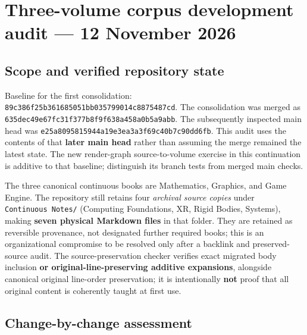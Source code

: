 \hypertarget{appendix-28e6f216fdc7}{}\label{referencestart:appendix-28e6f216fdc7}
\section{Three-volume corpus development audit --- 12 November 2026}\label{appendix-28e6f216fdc7-three-volume-corpus-development-audit-12-november-2026}

\subsection{Scope and verified repository state}\label{appendix-28e6f216fdc7-scope-and-verified-repository-state}

Baseline for the first consolidation: \texttt{89c386f25b361685051bb035799014c8875487cd}. The consolidation was merged as \texttt{635dec49e67fc31f377b8f9f638a458a0b5a9abb}. The subsequently inspected main head was \texttt{e25a8095815944a19e3ea3a3f69c40b7c90dd6fb}. This audit uses the contents of that \textbf{later main head} rather than assuming the merge remained the latest state. The new render-graph source-to-volume exercise in this continuation is additive to that baseline; distinguish its branch tests from merged main checks.

The three canonical continuous books are Mathematics, Graphics, and Game Engine. The repository still retains four \emph{archival source copies} under \texttt{Continuous\ Notes/} (Computing Foundations, XR, Rigid Bodies, Systems), making \textbf{seven physical Markdown files} in that folder. They are retained as reversible provenance, not designated further required books; this is an organizational compromise to be resolved only after a backlink and preserved-source audit. The source-preservation checker verifies exact migrated body inclusion \textbf{or original-line-preserving additive expansions}, alongside canonical original line-order preservation; it is intentionally \textbf{not} proof that all original content is coherently taught at first use.

\subsection{Change-by-change assessment}\label{appendix-28e6f216fdc7-change-by-change-assessment}


